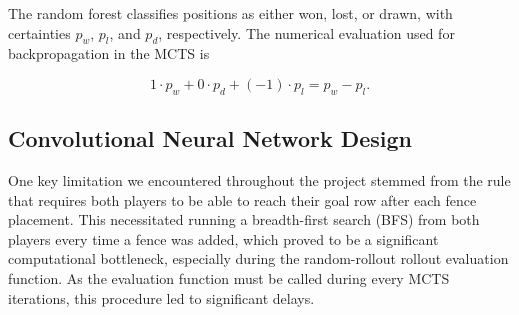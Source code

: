 \documentclass[10pt]{article}
\begin{document}
The random forest classifies positions as either won, lost, or drawn, with certainties $p_w$, $p_l$, and $p_d$, respectively. The numerical evaluation used for backpropagation in the MCTS is 

\begin{equation}
    1 \cdot p_w + 0 \cdot p_d + (-1) \cdot p_l = p_w - p_l.
\end{equation} 

\subsection{Convolutional Neural Network Design}
One key limitation we encountered throughout the project stemmed from the rule that requires both players to be able to reach their goal row after each fence placement. This necessitated running a breadth-first search (BFS) from both players every time a fence was added, which proved to be a significant computational bottleneck, especially during the random-rollout rollout evaluation function. As the evaluation function must be called during every MCTS iterations, this procedure led to significant delays.
\end{document}
